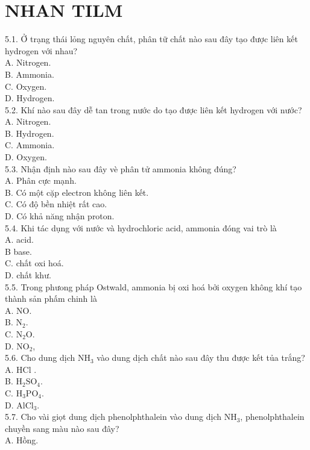 \documentclass[10pt]{article}
\begin{document}
\section*{NHAN TILM}
5.1. Ở trạng thái lỏng nguyên chất, phân tữ chất nào sau đây tạo được liên kết hydrogen với nhau?\\
A. Nitrogen.\\
B. Ammonia.\\
C. Oxygen.\\
D. Hydrogen.\\
5.2. Khí nào sau đây dễ tan trong nước do tạo được liên kết hydrogen với nước?\\
A. Nitrogen.\\
B. Hydrogen.\\
C. Ammonia.\\
D. Oxygen.\\
5.3. Nhận định nào sau đây vè phân tử ammonia không đúng?\\
A. Phân cực mạnh.\\
B. Có một cặp electron không liên kết.\\
C. Có độ bền nhiệt rất cao.\\
D. Có khả năng nhận proton.\\
5.4. Khi tác dụng với nước và hydrochloric acid, ammonia đóng vai trò là\\
A. acid.\\
B base.\\
C. chất oxi hoá.\\
D. chất khư.\\
5.5. Trong phưong pháp Ostwald, ammonia bị oxi hoá bởi oxygen không khí tạo thành sản phấm chinh là\\
A. NO.\\
B. $\mathrm{N}_{2}$.\\
C. $\mathrm{N}_{2} \mathrm{O}$.\\
D. $\mathrm{NO}_{2}$,\\
5.6. Cho dung dịch $\mathrm{NH}_{3}$ vào dung dịch chất nào sau đây thu được kết tủa trắng?\\
A. HCl .\\
B. $\mathrm{H}_{2} \mathrm{SO}_{4}$.\\
C. $\mathrm{H}_{3} \mathrm{PO}_{4}$.\\
D. $\mathrm{AlCl}_{3}$.\\
5.7. Cho vài giọt dung dịch phenolphthalein vào dung dịch $\mathrm{NH}_{3}$, phenolphthalein chuyền sang màu nào sau đây?\\
A. Hồng.\\
\end{document}
